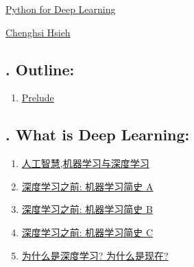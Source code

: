 \documentclass[11pt]{article}
\begin{document}
	\kaishu 
	\setcounter{section}{0}
	\begin{center}
		{\LARGE  \href{https://www.youtube.com/playlist?list=PLISXH-iEM4Jn3SEi07q8MJmDD6BaMWlJE}{Python for Deep Learning}}
		
		
		{\large \href{https://fin.ntub.edu.tw/p/412-1037-121.php?Lang=en}{Chenghsi Hsieh}}
	\end{center}
\setcounter{page}{1}



\vspace{-0.5cm}

\subsection*{\small {}. Outline:}

\vspace{-0.5cm}

\begin{multicols}{2}
	\begin{enumerate}
		\item \href{https://mp.weixin.qq.com/s/k5nhXuALPIh-f2q0Ttk73g}{Prelude}	%
	\end{enumerate}
\end{multicols}

\subsection*{\small {}.  What is Deep Learning:}

\vspace{-0.5cm}

\begin{multicols}{2}
	\begin{enumerate}
		\item \href{https://mp.weixin.qq.com/s/i2oj-hehepM_dMrFPsbuTA}{人工智慧,机器学习与深度学习}	%
		\item \href{https://mp.weixin.qq.com/s/B7Snaz2d-hn80VszjR4Zaw}{深度学习之前: 机器学习简史 A}	%
		\item \href{https://mp.weixin.qq.com/s/gttJNbZxRM3rUqDNbpJWdA}{深度学习之前: 机器学习简史 B}	%
		\item \href{https://mp.weixin.qq.com/s/UIhTzoWchAUXxx3f5lr70Q}{深度学习之前: 机器学习简史 C}	%
		\item \href{https://mp.weixin.qq.com/s/Yu2FSVFKTxDWbuMRnzucbg}{为什么是深度学习? 为什么是现在?}	%
	\end{enumerate}
\end{multicols}
\end{document}
